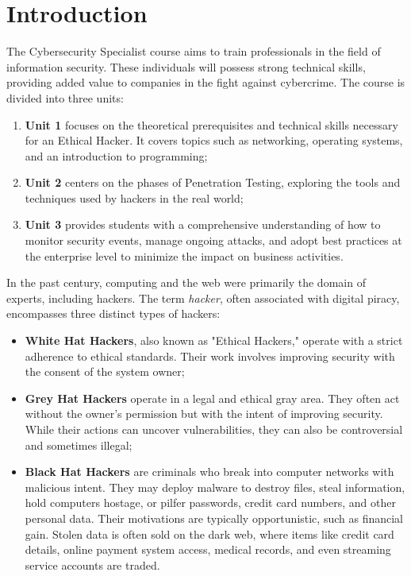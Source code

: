 \section{Introduction}
The Cybersecurity Specialist course aims to train professionals in the field of information security. These individuals will possess strong technical skills, providing added value to companies in the fight against cybercrime. The course is divided into three units:
\begin{enumerate}
    \item \textbf{Unit 1} focuses on the theoretical prerequisites and technical skills necessary for an Ethical Hacker. It covers topics such as networking, operating systems, and an introduction to programming;
    \item \textbf{Unit 2} centers on the phases of Penetration Testing, exploring the tools and techniques used by hackers in the real world;
    \item \textbf{Unit 3} provides students with a comprehensive understanding of how to monitor security events, manage ongoing attacks, and adopt best practices at the enterprise level to minimize the impact on business activities.
\end{enumerate}

In the past century, computing and the web were primarily the domain of experts, including hackers. The term \emph{hacker}, often associated with digital piracy, encompasses three distinct types of hackers:
\begin{itemize}
    \item \textbf{White Hat Hackers}, also known as "Ethical Hackers," operate with a strict adherence to ethical standards. Their work involves improving security with the consent of the system owner;
    \item \textbf{Grey Hat Hackers} operate in a legal and ethical gray area. They often act without the owner's permission but with the intent of improving security. While their actions can uncover vulnerabilities, they can also be controversial and sometimes illegal;
    \item \textbf{Black Hat Hackers} are criminals who break into computer networks with malicious intent. They may deploy malware to destroy files, steal information, hold computers hostage, or pilfer passwords, credit card numbers, and other personal data. Their motivations are typically opportunistic, such as financial gain. Stolen data is often sold on the dark web, where items like credit card details, online payment system access, medical records, and even streaming service accounts are traded.
\end{itemize}

